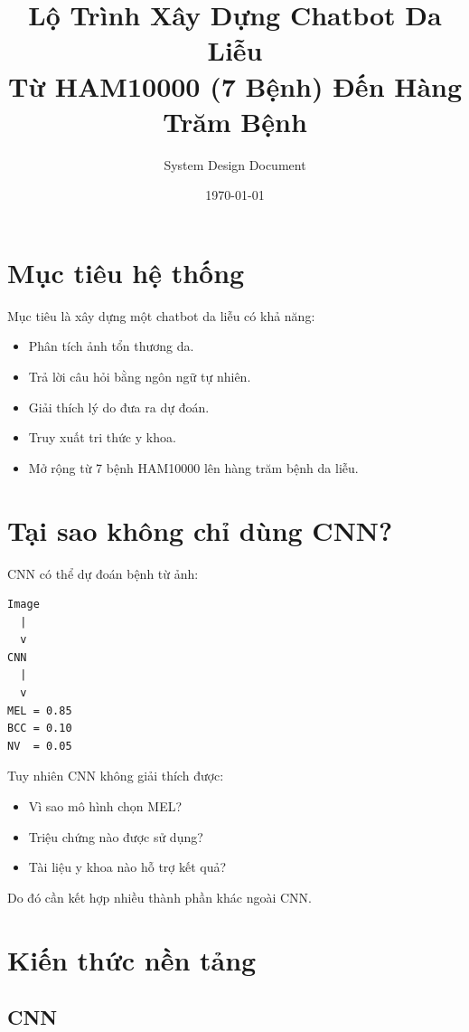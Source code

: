 \documentclass[12pt,a4paper]{article}
\title{Lộ Trình Xây Dựng Chatbot Da Liễu \\ Từ HAM10000 (7 Bệnh) Đến Hàng Trăm Bệnh}
\author{System Design Document}
\date{\today}
\begin{document}
\maketitle

\tableofcontents
\newpage

\section{Mục tiêu hệ thống}

Mục tiêu là xây dựng một chatbot da liễu có khả năng:

\begin{itemize}
\item Phân tích ảnh tổn thương da.
\item Trả lời câu hỏi bằng ngôn ngữ tự nhiên.
\item Giải thích lý do đưa ra dự đoán.
\item Truy xuất tri thức y khoa.
\item Mở rộng từ 7 bệnh HAM10000 lên hàng trăm bệnh da liễu.
\end{itemize}

\section{Tại sao không chỉ dùng CNN?}

CNN có thể dự đoán bệnh từ ảnh:

\begin{verbatim}
Image
  |
  v
CNN
  |
  v
MEL = 0.85
BCC = 0.10
NV  = 0.05
\end{verbatim}

Tuy nhiên CNN không giải thích được:

\begin{itemize}
\item Vì sao mô hình chọn MEL?
\item Triệu chứng nào được sử dụng?
\item Tài liệu y khoa nào hỗ trợ kết quả?
\end{itemize}

Do đó cần kết hợp nhiều thành phần khác ngoài CNN.

\section{Kiến thức nền tảng}

\subsection{CNN}
\end{document}
